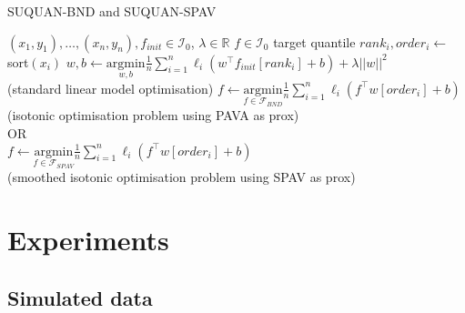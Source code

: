 \documentclass{article}
\newcommand{\RR}{\mathbb{R}} %
\newcommand{\Fcal}{\mathcal{F}}
\newcommand{\Ical}{\mathcal{I}}
\begin{document}
\begin{center}
\begin{minipage}{0.67\linewidth}
\begin{algorithm}[H]
\caption{SUQUAN-BND and SUQUAN-SPAV}
\label{alg:suquanBND}
\begin{algorithmic}[1]
\REQUIRE  $(x_1,y_1) , \ldots , (x_n,y_n), f_{init} \in \Ical_0$, $\lambda\in\RR$
\ENSURE $f\in\Ical_0$ target quantile
\STATE $rank_i , order_i  \leftarrow$ sort$(x_i)$
\ENDFOR
\STATE $w,b \leftarrow \underset{w, b}{\text{argmin}} \frac{1}{n} \sum_{i=1}^n \ell_i\left(w^\top f_{init}[rank_i]+b\right) + \lambda ||w||^2$ \\
 (standard linear model optimisation)
\STATE $f  \leftarrow \underset{f\in\Fcal_{BND}}{\text{argmin}} \frac{1}{n} \sum_{i=1}^n \ell_i\left( f^\top w[order_i]+b\right)$ \\
 (isotonic optimisation problem using PAVA as prox)\\
 OR\\
$f  \leftarrow \underset{f\in\Fcal_{SPAV}}{\text{argmin}} \frac{1}{n} \sum_{i=1}^n \ell_i\left( f^\top w[order_i]+b\right)$ \\
 (smoothed isotonic optimisation problem using SPAV as prox)\\
\end{algorithmic}
\end{algorithm}
\end{minipage}
\end{center}

\section{Experiments}

\subsection{Simulated data}
\end{document}
